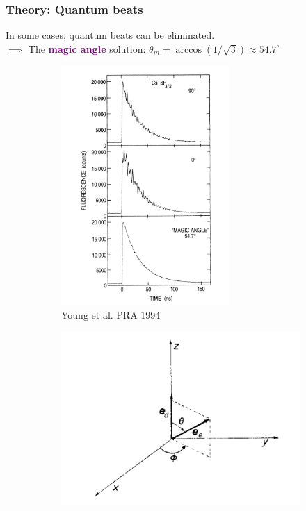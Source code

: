 \documentclass{beamer}
\theoremstyle{definition}
\begin{document}
\begin{frame}
\frametitle{Theory: Quantum beats}

In some cases, quantum beats can be eliminated.\\

$\implies$ The \textbf{\textcolor{purple}{magic angle}} solution: $\theta_m = \arccos(1/\sqrt{3}) \approx 54.7^\circ$

\begin{figure}[!htb]
	\centering	
	\vspace{-10pt}
	\begin{subfigure}{0.49\textwidth}
		\centering
		\includegraphics[width=0.7\textwidth]{young}
		\caption{Young et al. PRA 1994}
	\end{subfigure}
	\begin{subfigure}{0.49\textwidth}
		\centering
		\includegraphics[width=\textwidth]{beats_1}
	\end{subfigure}
\end{figure}



\end{frame}
\end{document}
